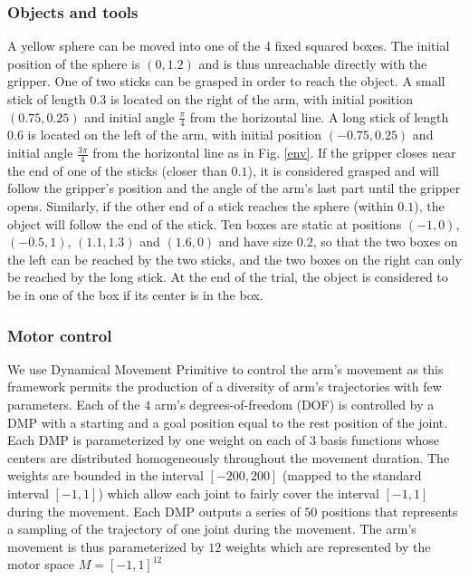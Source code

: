 \documentclass[10pt,letterpaper]{article}
\begin{document}
		
			
		\subsubsection{Objects and tools}
			
			A yellow sphere can be moved into one of the 4 fixed squared boxes. 
			The initial position of the sphere is $(0, 1.2)$ and is thus unreachable directly with the gripper.
			One of two sticks can be grasped in order to reach the object.
			A small stick of length $0.3$ is located on the right of the arm, with initial position $(0.75, 0.25)$ and initial angle $\frac{\pi}{4}$ from the horizontal line.
			A long stick of length $0.6$ is located on the left of the arm, with initial position $(-0.75, 0.25)$ and initial angle $\frac{3\pi}{4}$ from the horizontal line as in Fig. \ref{env}.			
			If the gripper closes near the end of one of the sticks (closer than $0.1$), it is considered grasped and will follow the gripper's position and the angle of the arm's last part until the gripper opens.			
			Similarly, if the other end of a stick reaches the sphere (within $0.1$), the object will follow the end of the stick.
			Ten boxes are static at positions $(-1, 0)$, $(-0.5, 1)$, $(1.1, 1.3)$ and $(1.6, 0)$ and have size $0.2$, 
			so that the two boxes on the left can be reached by the two sticks, and the two boxes on the right can only be reached by the long stick.
			At the end of the trial, the object is considered to be in one of the box if its center is in the box.\\
		
		
		\subsubsection{Motor control}
		
			We use Dynamical Movement Primitive \cite{ijspeert_dynamical_2013} to control the arm's movement as this framework permits the production of a diversity of arm's trajectories with few parameters.
			Each of the $4$ arm's degrees-of-freedom (DOF) is controlled by a DMP with a starting and a goal position equal to the rest position of the joint.
			Each DMP is parameterized by one weight on each of $3$ basis functions whose centers are distributed homogeneously throughout the movement duration.
			The weights are bounded in the interval $[-200,200]$ (mapped to the standard interval $[-1,1]$) which allow each joint to fairly cover the interval $[-1,1]$ during the movement.
			Each DMP outputs a series of $50$ positions that represents a sampling of the trajectory of one joint during the movement.		
			The arm's movement is thus parameterized by $12$ weights which are represented by the motor space $M=[-1,1]^{12}$
		
\end{document}
